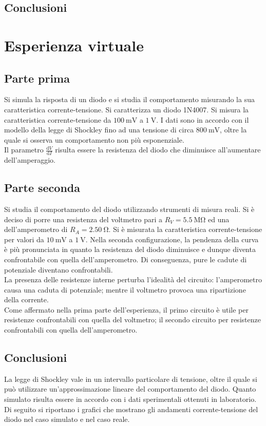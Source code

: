 \documentclass[a4paper]{article}
\begin{document}
\subsection{Conclusioni}

\clearpage

\section{Esperienza virtuale}
\subsection{Parte prima}
Si simula la risposta di un diodo e si studia il comportamento misurando la sua caratteristica corrente-tensione. Si caratterizza un diodo 1N4007. Si misura la caratteristica corrente-tensione da $\SI{100}{\mV}$ a $\SI{1}{\V}$.
I dati sono in accordo con il modello della legge di Shockley fino ad una tensione di circa $\SI{800}{\mV}$, oltre la quale si osserva un comportamento non più esponenziale.\\
Il parametro $\frac{\mathrm{d}V}{\mathrm{d}I}$ risulta essere la resistenza del diodo che diminuisce all'aumentare dell'amperaggio.

\subsection{Parte seconda}
Si studia il comportamento del diodo utilizzando strumenti di misura reali. Si è deciso di porre una resistenza del voltmetro pari a $R_V=\SI{5.5}{\Mohm}$ ed una dell'amperometro di $R_A=\SI{2.50}{\ohm}$.
Si è misurata la caratteristica corrente-tensione per valori da $\SI{10}{\mV}$ a $\SI{1}{\V}$.
Nella seconda configurazione, la pendenza della curva è più pronunciata in quanto la resistenza del diodo diminuisce e dunque diventa confrontabile con quella dell'amperometro. Di conseguenza, pure le cadute di potenziale diventano confrontabili.\\
La presenza delle resistenze interne perturba l'idealità del circuito: l'amperometro causa una caduta di potenziale; mentre il voltmetro provoca una ripartizione della corrente.\\
Come affermato nella prima parte dell'esperienza, il primo circuito è utile per resistenze confrontabili con quella del voltmetro; il secondo circuito per resistenze confrontabili con quella dell'amperometro.

\subsection{Conclusioni}
La legge di Shockley vale in un intervallo particolare di tensione, oltre il quale si può utilizzare un'approssimazione lineare del comportamento del diodo. Quanto simulato risulta essere in accordo con i dati sperimentali ottenuti in laboratorio.\\
Di seguito si riportano i grafici che mostrano gli andamenti corrente-tensione del diodo nel caso simulato e nel caso reale.
\end{document}
